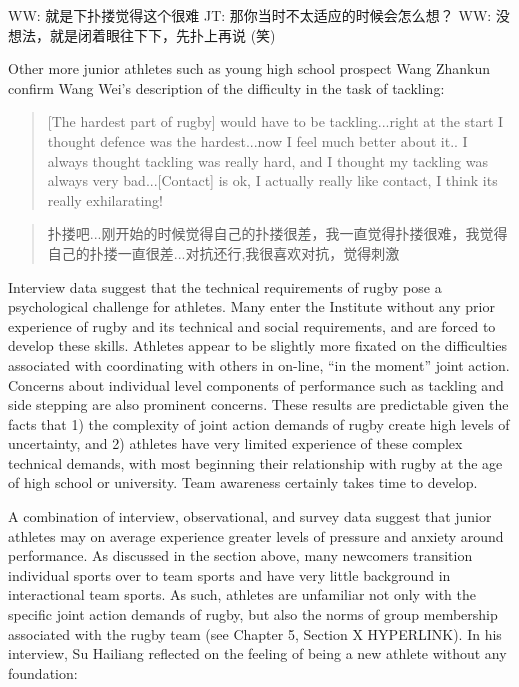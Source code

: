 \begin{CJK}{UTF8}{gbsn}
\begin{Quotation}
  WW: 就是下扑搂觉得这个很难
  JT: 那你当时不太适应的时候会怎么想？
  WW: 没想法，就是闭着眼往下下，先扑上再说 (笑)
\end{Quotation}


Other more junior athletes such as young high school prospect Wang Zhankun confirm Wang Wei's description of the difficulty in the task of tackling:

\begin{quotation}
  [The hardest part of rugby] would have to be tackling...right at the start I thought defence was the hardest...now I feel much better about it.. I always thought tackling was really hard, and I thought my tackling was always very bad...[Contact] is ok, I actually really like contact, I think its really exhilarating!
\end{quotation}

\begin{quotation}
  扑搂吧...刚开始的时候觉得自己的扑搂很差，我一直觉得扑搂很难，我觉得自己的扑搂一直很差...对抗还行,我很喜欢对抗，觉得刺激
\end{quotation}

Interview data suggest that the technical requirements of rugby pose a psychological challenge for athletes.  Many enter the Institute without any prior experience of rugby and its technical and social requirements, and are forced to develop these skills.  Athletes appear to be slightly more fixated on the difficulties associated with coordinating with others in on-line, ``in the moment'' joint action. Concerns about individual level components of performance such as tackling and side stepping are also prominent concerns.  These results are predictable given the facts that 1) the complexity of joint action demands of rugby create high levels of uncertainty, and 2) athletes have very limited experience of these complex technical demands, with most beginning their relationship with rugby at the age of high school or university. Team awareness certainly takes time to develop.




A combination of interview, observational, and survey data suggest that junior athletes may on average experience greater levels of pressure and anxiety around performance.  As discussed in the section above, many newcomers transition individual sports over to team sports and have very little background in interactional team sports. As such, athletes are unfamiliar not only with the specific joint action demands of rugby, but also the norms of group membership associated with the rugby team (see Chapter 5, Section X HYPERLINK).  In his interview, Su Hailiang reflected on the feeling of being a new athlete without any foundation:


\end{CJK}
